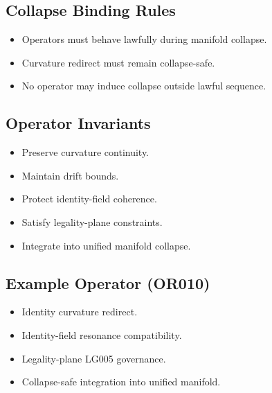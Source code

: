 \subsection{Collapse Binding Rules}
\begin{itemize}
    \item Operators must behave lawfully during manifold collapse.
    \item Curvature redirect must remain collapse-safe.
    \item No operator may induce collapse outside lawful sequence.
\end{itemize}

\subsection{Operator Invariants}
\begin{itemize}
    \item Preserve curvature continuity.
    \item Maintain drift bounds.
    \item Protect identity-field coherence.
    \item Satisfy legality-plane constraints.
    \item Integrate into unified manifold collapse.
\end{itemize}

\subsection{Example Operator (OR010)}
\begin{itemize}
    \item Identity curvature redirect.
    \item Identity-field resonance compatibility.
    \item Legality-plane LG005 governance.
    \item Collapse-safe integration into unified manifold.
\end{itemize}
